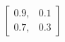 \documentclass[border=3mm,preview]{standalone}\usepackage{amsmath}
\begin{document}
\[ \left[\begin{array}{cc} 
0.9, & 0.1 \\ 
0.7, & 0.3 
\end{array}\right] \] 
\end{document}
